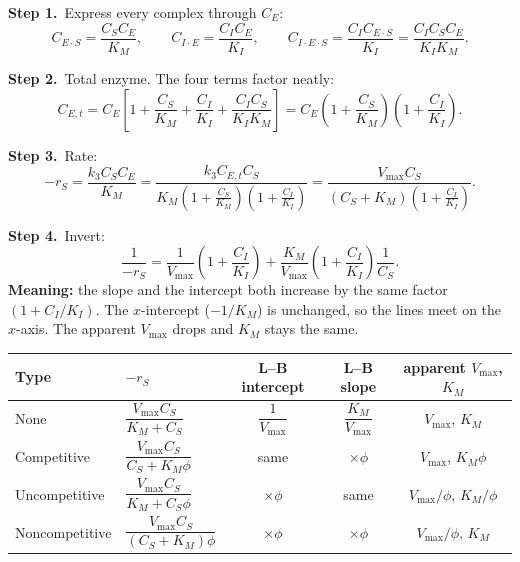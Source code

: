 \documentclass[11pt]{article}
\newcommand{\step}[1]{\par\smallskip\textcolor{stepgray}{\textbf{Step #1.}}\ }
\begin{document}
\step{1}Express every complex through $C_E$:
\[
C_{E\cdot S}=\frac{C_SC_E}{K_M},\qquad C_{I\cdot E}=\frac{C_IC_E}{K_I},\qquad
C_{I\cdot E\cdot S}=\frac{C_IC_{E\cdot S}}{K_I}=\frac{C_IC_SC_E}{K_IK_M}.
\]
\step{2}Total enzyme. The four terms factor neatly:
\[
C_{E,t}=C_E\left[1+\frac{C_S}{K_M}+\frac{C_I}{K_I}+\frac{C_IC_S}{K_IK_M}\right]
=C_E\left(1+\frac{C_S}{K_M}\right)\left(1+\frac{C_I}{K_I}\right).
\]
\step{3}Rate:
\[
-r_S=\frac{k_3C_SC_E}{K_M}=\frac{k_3C_{E,t}C_S}{K_M\left(1+\frac{C_S}{K_M}\right)\left(1+\frac{C_I}{K_I}\right)}
=\frac{V_{\max}C_S}{(C_S+K_M)\left(1+\frac{C_I}{K_I}\right)}.
\]
\step{4}Invert:
\[
\frac{1}{-r_S}=\frac{1}{V_{\max}}\left(1+\frac{C_I}{K_I}\right)+\frac{K_M}{V_{\max}}\left(1+\frac{C_I}{K_I}\right)\frac{1}{C_S}.
\]
\textbf{Meaning:} the slope and the intercept both increase by the same factor $(1+C_I/K_I)$. The $x$-intercept
($-1/K_M$) is unchanged, so the lines meet on the $x$-axis. The apparent $V_{\max}$ drops and $K_M$ stays the same.

\begin{center}
\end{center}

\begin{keyresult}[Inhibition summary: write $\phi=1+C_I/K_I$]
\renewcommand{\arraystretch}{1.5}
\begin{tabular}{llccc}
\toprule
Type & $-r_S$ & L--B intercept & L--B slope & apparent $V_{\max}$, $K_M$\\
\midrule
None & $\dfrac{V_{\max}C_S}{K_M+C_S}$ & $\dfrac{1}{V_{\max}}$ & $\dfrac{K_M}{V_{\max}}$ & $V_{\max}$, $K_M$\\
Competitive & $\dfrac{V_{\max}C_S}{C_S+K_M\phi}$ & same & $\times\phi$ & $V_{\max}$, $K_M\phi$\\
Uncompetitive & $\dfrac{V_{\max}C_S}{K_M+C_S\phi}$ & $\times\phi$ & same & $V_{\max}/\phi$, $K_M/\phi$\\
Noncompetitive & $\dfrac{V_{\max}C_S}{(C_S+K_M)\phi}$ & $\times\phi$ & $\times\phi$ & $V_{\max}/\phi$, $K_M$\\
\bottomrule
\end{tabular}
\end{keyresult}
\end{document}
